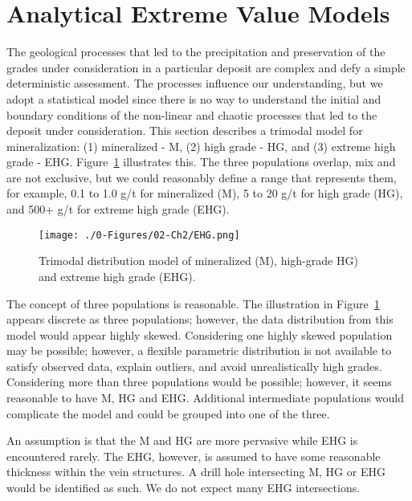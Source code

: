 \FloatBarrier
\section{Analytical Extreme Value Models}
\label{sec:02analytical}

The geological processes that led to the precipitation and preservation of the grades under consideration in a particular deposit are complex and defy a simple deterministic assessment. The processes influence our understanding, but we adopt a statistical model since there is no way to understand the initial and boundary conditions of the non-linear and chaotic processes that led to the deposit under consideration. This section describes a trimodal model for mineralization: (1) mineralized - M, (2) high grade - HG, and (3) extreme high grade - EHG. Figure~\ref{fig:ehg} illustrates this. The three populations overlap, mix and are not exclusive, but we could reasonably define a range that represents them, for example, 0.1 to 1.0 g/t for mineralized (M), 5 to 20 g/t for high grade (HG), and 500+ g/t for extreme high grade (EHG).

\begin{figure}[htb!]
    \centering
    \texttt{[image: ./0-Figures/02-Ch2/EHG.png]}
    \caption{Trimodal distribution model of mineralized (M), high-grade HG) and extreme high grade (EHG).}
    \label{fig:ehg}
\end{figure}


The concept of three populations is reasonable. The illustration in Figure~\ref{fig:ehg} appears discrete as three populations; however, the data distribution from this model would appear highly skewed. Considering one highly skewed population may be possible; however, a flexible parametric distribution is not available to satisfy observed data, explain outliers, and avoid unrealistically high grades. Considering more than three populations would be possible; however, it seems reasonable to have M, HG and EHG. Additional intermediate populations would complicate the model and could be grouped into one of the three.

An assumption is that the M and HG are more pervasive while EHG is encountered rarely. The EHG, however, is assumed to have some reasonable thickness within the vein structures. A drill hole intersecting M, HG or EHG would be identified as such. We do not expect many EHG intersections.


